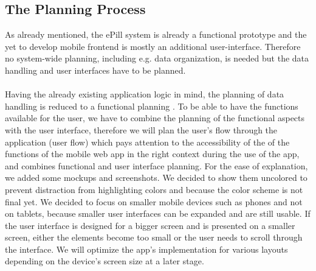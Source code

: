 \subsection{The Planning Process}
\label{subsec:Planning}
As already mentioned, the ePill system is already a functional prototype and the yet to develop mobile frontend is mostly an additional user-interface. Therefore no system-wide planning, including e.g. data organization, is needed but the data handling and user interfaces have to be planned.
\\
\\
Having the already existing application logic in mind, the planning of data handling is reduced to a functional planning . To be able to have the functions available for the user, we have to combine the planning of the functional aspects with the user interface, therefore we will plan the user's flow through the application (user flow) which pays attention to the accessibility of the of the functions of the mobile web app in the right context during the use of the app, and combines functional and user interface planning. For the ease of explanation, we added some mockups and screenshots. We decided to show them uncolored to prevent distraction from highlighting colors and because the color scheme is not final yet. We decided to focus on smaller mobile devices such as phones and not on tablets, because smaller user interfaces can be expanded and are still usable. If the user interface is designed for a bigger screen and is presented on a smaller screen, either the elements become too small or the user needs to scroll through the interface. We will optimize the app's implementation for various layouts depending on the device's screen size at a later stage.
\\
